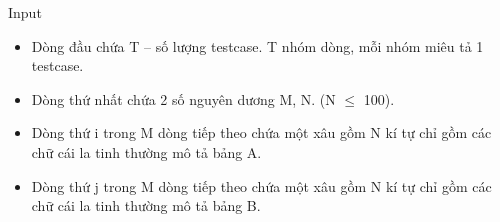 Input
\begin{itemize}
	\item Dòng đầu chứa T – số lượng testcase. T nhóm dòng, mỗi nhóm miêu tả 1 testcase.
	\item Dòng thứ nhất chứa 2 số nguyên dương M, N. (N  $\le$  100).
	\item Dòng thứ i trong M dòng tiếp theo chứa một xâu gồm N kí tự chỉ gồm các chữ cái la tinh thường mô tả bảng A.
	\item Dòng thứ j trong M dòng tiếp theo chứa một xâu gồm N kí tự chỉ gồm các chữ cái la tinh thường mô tả bảng B.
\end{itemize}